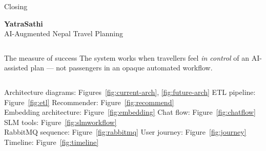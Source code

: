 \documentclass[aspectratio=169,professionalfonts]{beamer}
\begin{document}
\begin{frame}{Closing}
  \vspace{0.4cm}
  \begin{center}
    \Large\textcolor{ysblue}{\textbf{YatraSathi}}\\[0.3cm]
    \normalsize\textcolor{ysgray}{AI-Augmented Nepal Travel Planning}\\[0.6cm]
  \end{center}

  \begin{columns}[c]
    \centering

    \begin{exampleblock}{The measure of success}
      The system works when travellers feel \emph{in control} of an
      AI-assisted plan — not passengers in an opaque automated workflow.
    \end{exampleblock}
  \end{columns}

  \vspace{0.4cm}
  \centering\small
  Architecture diagrams: Figures~\ref{fig:current-arch}, \ref{fig:future-arch} \quad
  ETL pipeline: Figure~\ref{fig:etl} \quad
  Recommender: Figure~\ref{fig:recommend}\\
  Embedding architecture: Figure~\ref{fig:embedding} \quad
  Chat flow: Figure~\ref{fig:chatflow} \quad
  SLM tools: Figure~\ref{fig:slmworkflow}\\
  RabbitMQ sequence: Figure~\ref{fig:rabbitmq} \quad
  User journey: Figure~\ref{fig:journey} \quad
  Timeline: Figure~\ref{fig:timeline}
\end{frame}
\end{document}
